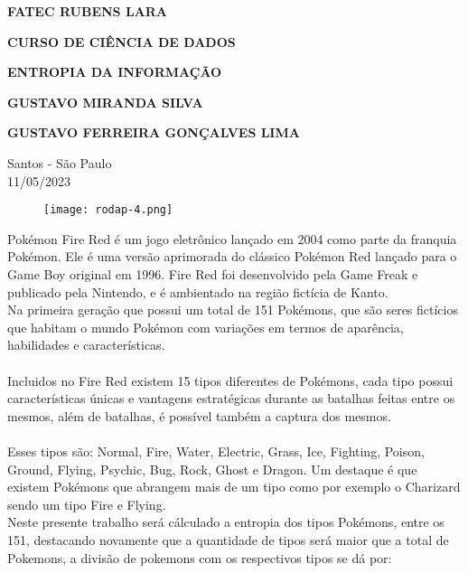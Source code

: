 \documentclass[a4paper,12pt]{article}
\begin{document}
\begin{center}
\textbf{FATEC RUBENS LARA}

\textbf{CURSO DE CIÊNCIA DE DADOS}

\vspace{3cm}

\textbf{ENTROPIA DA INFORMAÇÃO}

\vspace{3cm}

\textbf{GUSTAVO MIRANDA SILVA}

\textbf{GUSTAVO FERREIRA GONÇALVES LIMA}

\vfill

\begin{flushright}
Santos - São Paulo\\
11/05/2023
\end{flushright}
\end{center}

\begin{figure}{}
\centering
\label{}
\texttt{[image: rodap-4.png]}
\end{figure}

\clearpage


Pokémon Fire Red é um jogo eletrônico lançado em 2004 como parte da franquia Pokémon. Ele é uma versão aprimorada do clássico Pokémon Red lançado para o Game Boy original em 1996. Fire Red foi desenvolvido pela Game Freak e publicado pela Nintendo, e é ambientado na região fictícia de Kanto.\\

Na primeira geração que possui um total de 151 Pokémons, que são seres fictícios que habitam o mundo Pokémon com variações em termos de aparência, habilidades e características. \\\\Incluidos no Fire Red existem 15 tipos diferentes de Pokémons, cada tipo possui características únicas e vantagens estratégicas durante as batalhas feitas entre os mesmos, além de batalhas, é possível também a captura dos mesmos.\\\\ Esses tipos são: Normal, Fire, Water, Electric, Grass, Ice, Fighting, Poison, Ground, Flying, Psychic, Bug, Rock, Ghost e Dragon. Um destaque é que existem Pokémons que abrangem mais de um tipo como por exemplo o Charizard sendo um tipo Fire e Flying.\\

Neste presente trabalho será cálculado a entropia dos tipos Pokémons, entre os 151, destacando novamente que a quantidade de tipos será maior que a total de Pokemons, a divisão de pokemons com os respectivos tipos se dá por:\\
\end{document}
